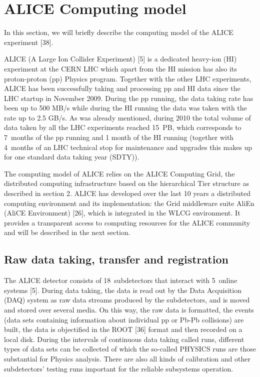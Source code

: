 \section{ALICE Computing model}

In this section, we will briefly describe the computing model of the
ALICE experiment [38].

ALICE (A Large Ion Collider Experiment) [5] is a dedicated heavy-ion
(HI) experiment at the CERN LHC which apart from the HI mission has
also its proton-proton (pp) Physics program. Together with the other
LHC experiments, ALICE has been successfully taking and processing
pp and HI data since the LHC startup in November 2009. During the pp
running, the data taking rate has been up to 500 MB/s while during
the HI running the data was taken with the rate up to 2.5 GB/s. As
was already mentioned, during 2010 the total volume of data taken by
all the LHC experiments reached 15~PB, which corresponds to 7~months
of the pp running and 1 month of the HI running (together with
4~months of an LHC technical stop for maintenance and upgrades this
makes up for one standard data taking year (SDTY)).

The computing model of ALICE relies on the ALICE Computing Grid, the
distributed computing infrastructure based on the hierarchical Tier
structure as described in section 2.  ALICE has developed over the
last 10 years a distributed computing environment and its
implementation: the Grid middleware suite AliEn (AliCE Environment)
[26], which is integrated in the WLCG environment. It provides a
transparent access to computing resources for the ALICE community
and will be described in the next section.

\subsection{Raw data taking, transfer and registration}
%
The ALICE detector consists of 18~subdetectors that interact with
5~online systems [5]. During data taking, the data is read out by
the Data Acquisition (DAQ) system as raw data streams produced by
the subdetectors, and is moved and stored over several media. On
this way, the raw data is formatted, the events (data sets
containing information about individual pp or Pb-Pb collisions) are
built, the data is objectified in the ROOT [36] format and then
recorded on a local disk. During the intervals of continuous data
taking called runs, different types of data sets can be collected of
which the so-called PHYSICS runs are those substantial for Physics
analysis. There are also all kinds of calibration and other
subdetectors' testing runs important for the reliable subsystems
operation.

